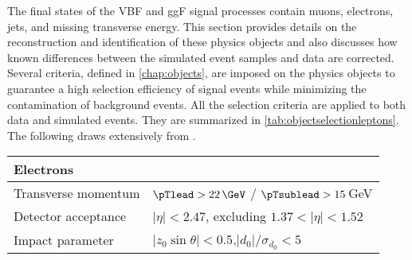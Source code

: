 The final states of the VBF and ggF signal processes contain muons, electrons, jets, and missing transverse energy. 
This section provides details on the reconstruction and identification of these physics objects and also discusses how known differences between the simulated event samples and data are corrected.
Several criteria, defined in \cref{chap:objects}, are imposed on the physics objects to guarantee a high selection efficiency of signal events while minimizing the contamination of background events. 
All the selection criteria are applied to both data and simulated events. They are summarized in \cref{tab:objectselectionleptons}.
The following draws extensively from .

\FloatBarrier
\begin{table}[t]
    \centering
    \begin{tabular}{l@{\hskip 0.5in} l}
        \toprule
        Electrons                &                                                              \\
        \midrule
        Transverse momentum      & $\pTlead > 22\,\GeV$ / $\pTsublead > 15\,$GeV        \\
        Detector acceptance      & $|\eta| < 2.47$, excluding $1.37 < |\eta| < 1.52$            \\
        Impact parameter         & $|z_0\sin\theta| < 0.5$,\quad $|d_0|/\sigma_{d_0} < 5$       \\


\end{tabular}
\end{table}
